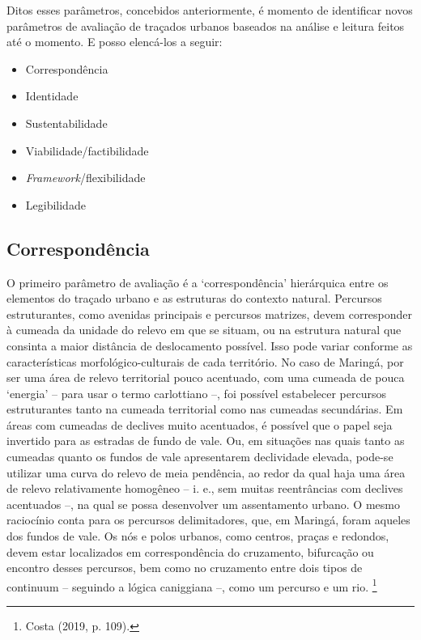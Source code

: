 \documentclass[12pt, a4paper]{book} %
\begin{document}
        Ditos esses parâmetros, concebidos anteriormente, é momento de identificar novos parâmetros de avaliação de traçados urbanos baseados na análise e leitura feitos até o momento. E posso elencá-los a seguir:

        \begin{itemize}
            \item Correspondência
            \item Identidade
            \item Sustentabilidade
            \item Viabilidade/factibilidade
            \item \textit{Framework}/flexibilidade
            \item Legibilidade
        \end{itemize}

                \subsection*{Correspondência}

        O primeiro parâmetro de avaliação é a ‘correspondência’ hierárquica entre os elementos do traçado urbano e as estruturas do contexto natural. Percursos estruturantes, como avenidas principais e percursos matrizes, devem corresponder à cumeada da unidade do relevo em que se situam, ou na estrutura natural que consinta a maior distância de deslocamento possível. Isso pode variar conforme as características morfológico-culturais de cada território. No caso de Maringá, por ser uma área de relevo territorial pouco acentuado, com uma cumeada de pouca ‘energia’ – para usar o termo carlottiano –, foi possível estabelecer percursos estruturantes tanto na cumeada territorial como nas cumeadas secundárias. Em áreas com cumeadas de declives muito acentuados, é possível que o papel seja invertido para as estradas de fundo de vale. Ou, em situações nas quais tanto as cumeadas quanto os fundos de vale apresentarem declividade elevada, pode-se utilizar uma curva do relevo de meia pendência, ao redor da qual haja uma área de relevo relativamente homogêneo – i. e., sem muitas reentrâncias com declives acentuados –, na qual se possa desenvolver um assentamento urbano. O mesmo raciocínio conta para os percursos delimitadores, que, em Maringá, foram aqueles dos fundos de vale. Os nós e polos urbanos, como centros, praças e redondos, devem estar localizados em correspondência do cruzamento, bifurcação ou encontro desses percursos, bem como no cruzamento entre dois tipos de continuum – seguindo a lógica caniggiana –, como um percurso e um rio. \footnote[27]{Costa (2019, p. 109).}
\end{document}
